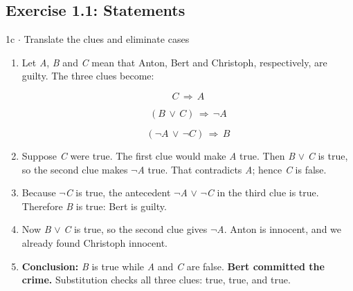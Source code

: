 \documentclass[11pt]{article}
\begin{document}
\begin{keepsection}\subsection{Exercise 1.1: Statements}

\begin{workedbox}{1c \ensuremath{\cdot} Translate the clues and eliminate cases}
\begin{enumerate}
\item {}
Let \textit{A}, \textit{B} and \textit{C} mean that Anton, Bert and Christoph, respectively, are guilty. The three clues become:

\begin{equation*}{C}\, \Rightarrow \, {A}\end{equation*}

\begin{equation*}({B}\, \lor \, {C})\, \Rightarrow \, \neg {A}\end{equation*}

\begin{equation*}(\neg {A}\, \lor \, \neg {C})\, \Rightarrow \, {B}\end{equation*}
\item Suppose \textit{C} were true. The first clue would make \textit{A} true. Then \textit{B} \ensuremath{\lor} \textit{C} is true, so the second clue makes \ensuremath{\neg}\textit{A} true. That contradicts \textit{A}; hence \textit{C} is false.
\item Because \ensuremath{\neg}\textit{C} is true, the antecedent \ensuremath{\neg}\textit{A} \ensuremath{\lor} \ensuremath{\neg}\textit{C} in the third clue is true. Therefore \textit{B} is true: Bert is guilty.
\item Now \textit{B} \ensuremath{\lor} \textit{C} is true, so the second clue gives \ensuremath{\neg}\textit{A}. Anton is innocent, and we already found Christoph innocent.
\item \textbf{Conclusion:} \textit{B} is true while \textit{A} and \textit{C} are false. \textbf{Bert committed the crime.} Substitution checks all three clues: true, true, and true.
\end{enumerate}
\end{workedbox}

\end{keepsection}
\end{document}
